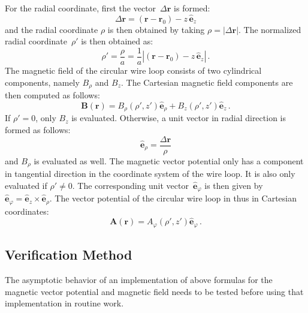 For the radial coordinate, first the vector~$\Delta \mathbf{r}$ is formed:
\begin{equation}
  \Delta \mathbf{r} = (\mathbf{r} - \mathbf{r}_0) - z \, \hat{\mathbf{e}}_z
\end{equation}
and the radial coordinate $\rho$ is then obtained by taking $\rho = |\Delta \mathbf{r}|$.
The normalized radial coordinate~$\rho'$ is then obtained as:
\begin{equation}
  \rho' = \frac{\rho}{a} = \frac{1}{a} |(\mathbf{r} - \mathbf{r}_0) - z \, \hat{\mathbf{e}}_z| \, .
\end{equation}
The magnetic field of the circular wire loop consists of two cylindrical components, namely $B_\rho$ and $B_z$.
The Cartesian magnetic field components are then computed as follows:
\begin{equation}
  \mathbf{B}(\mathbf{r}) = B_\rho(\rho', z') \hat{\mathbf{e}}_\rho + B_z(\rho', z') \hat{\mathbf{e}}_z \, .
\end{equation}
If $\rho' = 0$, only $B_z$ is evaluated.
Otherwise, a unit vector in radial direction is formed as follows:
\begin{equation}
  \hat{\mathbf{e}}_\rho = \frac{\Delta \mathbf{r}}{\rho}
\end{equation}
and $B_\rho$ is evaluated as well.
The magnetic vector potential only has a component in tangential direction in the coordinate system of the wire loop.
It is also only evaluated if $\rho' \neq 0$.
The corresponding unit vector~$\hat{\mathbf{e}}_\varphi$ is then given by
$\hat{\mathbf{e}}_\varphi = \hat{\mathbf{e}}_z \times \hat{\mathbf{e}}_\rho$.
The vector potential of the circular wire loop in thus in Cartesian coordinates:
\begin{equation}
  \mathbf{A}(\mathbf{r}) = A_\varphi(\rho', z') \hat{\mathbf{e}}_\varphi \, .
\end{equation}

\subsection{Verification Method}
The asymptotic behavior of an implementation of above formulas for the magnetic vector potential
and magnetic field needs to be tested before using that implementation in routine work.

